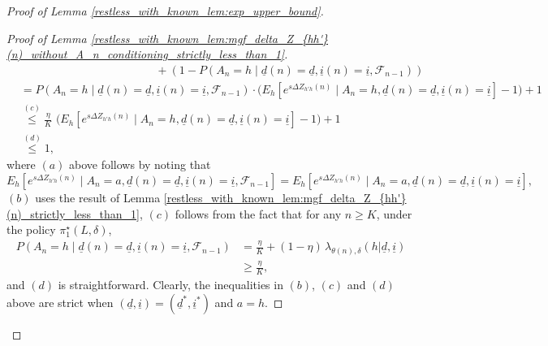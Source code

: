 \begin{proof}[Proof of Lemma \ref{restless_with_known_lem:exp_upper_bound}]
\begin{proof}[Proof of Lemma \ref{restless_with_known_lem:mgf_delta_Z_{hh'}(n)_without_A_n_conditioning_strictly_less_than_1}]
\begin{align}
	&\hspace{5cm}+(1-P(A_n=h\mid \underline{d}(n)=\underline{d},\underline{i}(n)=\underline{i},\mathcal{F}_{n-1}))\nonumber\\
	&=P(A_n=h\mid \underline{d}(n)=\underline{d},\underline{i}(n)=\underline{i},\mathcal{F}_{n-1})\cdot \bigg(E_h\left[e^{s\Delta Z_{h'h}(n)}\mid A_n=h,\underline{d}(n)=\underline{d},\underline{i}(n)=\underline{i}\right]-1\bigg) + 1\nonumber\\
	&\stackrel{(c)}{\leq} \frac{\eta}{K}\,\,\bigg(E_h\left[e^{s\Delta Z_{h'h}(n)}\mid A_n=h,\underline{d}(n)=\underline{d},\underline{i}(n)=\underline{i}\right]-1\bigg) + 1\label{restless_with_known_eq:temp_1}\\
	&\stackrel{(d)}{\leq} 1,\label{restless_with_known_eq:temp_2}
\end{align}
where $(a)$ above follows by noting that $$E_h\left[e^{s\Delta Z_{h'h}(n)}\mid A_n=a,\underline{d}(n)=\underline{d},\underline{i}(n)=\underline{i},\mathcal{F}_{n-1}\right]=E_h\left[e^{s\Delta Z_{h'h}(n)}\mid A_n=a,\underline{d}(n)=\underline{d},\underline{i}(n)=\underline{i}\right],$$ $(b)$ uses the result of Lemma \ref{restless_with_known_lem:mgf_delta_Z_{hh'}(n)_strictly_less_than_1}, $(c)$ follows from the fact that for any $n\geq K$, under the policy $\pi_1^\star(L,\delta)$,
\begin{align*}
	P(A_n=h\mid\underline{d}(n)=\underline{d},\underline{i}(n)=\underline{i},\mathcal{F}_{n-1})&=\frac{\eta}{K}+(1-\eta)\,\lambda_{\theta(n),\delta}(h|\underline{d},\underline{i})\\
	&\geq \frac{\eta}{K},
\end{align*}
and $(d)$ is straightforward.
Clearly, the inequalities in $(b)$, $(c)$ and $(d)$ above are strict when $(\underline{d},\underline{i})=(\underline{d}^*,\underline{i}^*)$ and $a=h$. 
\end{proof}


\end{proof}
